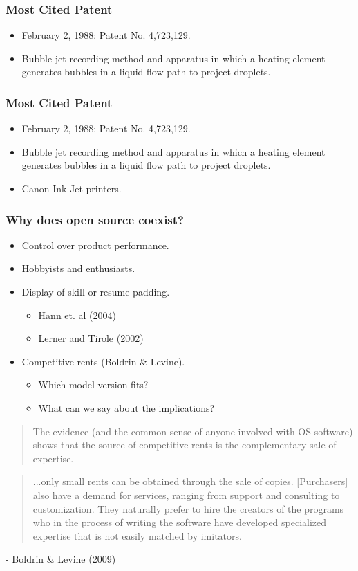 \documentclass{beamer}
\begin{document}
\begin{frame}[t]\frametitle{Most Cited Patent} 
  \begin{itemize}
    \item<+-> February 2, 1988: Patent No. 4,723,129.
    \item<+-> Bubble jet recording method and apparatus in which a heating element generates bubbles in a liquid flow path to project droplets.
  \end{itemize}
\end{frame}


\begin{frame}[t]\frametitle{Most Cited Patent} 
  \begin{itemize}
    \item February 2, 1988: Patent No. 4,723,129.
    \item Bubble jet recording method and apparatus in which a heating element generates bubbles in a liquid flow path to project droplets.
    \item Canon Ink Jet printers.
  \end{itemize}
\end{frame}
\begin{frame}[t]
  \frametitle{Why does open source coexist?}
  \begin{itemize}
    \item<+-> Control over product performance.
    \item<+-> Hobbyists and enthusiasts.
    \item<+-> Display of skill or resume padding. %
    \begin{itemize}
        \item<+-> Hann et. al (2004)
        \item<+-> Lerner and Tirole (2002)
    \end{itemize}
    \item<+-> Competitive rents (Boldrin \& Levine).
    \begin{itemize}
        \item<+-> Which model version fits?
        \item<+-> What can we say about the implications?
    \end{itemize}
  \end{itemize}
\end{frame}

\begin{frame}[t]
  \begin{quotation}
    The evidence (and the common sense of anyone involved with OS software) shows   that the source of competitive rents is the complementary sale of expertise.
  \end{quotation}
  \begin{quotation}
      ...only small rents can be obtained through the sale of copies. [Purchasers] also have a demand for services, ranging from support and consulting to customization. They naturally prefer to hire the creators of the programs who in the process of writing the software have developed specialized expertise that is not easily matched by imitators.
  \end{quotation}
  - Boldrin \& Levine (2009)
\end{frame}
\end{document}
